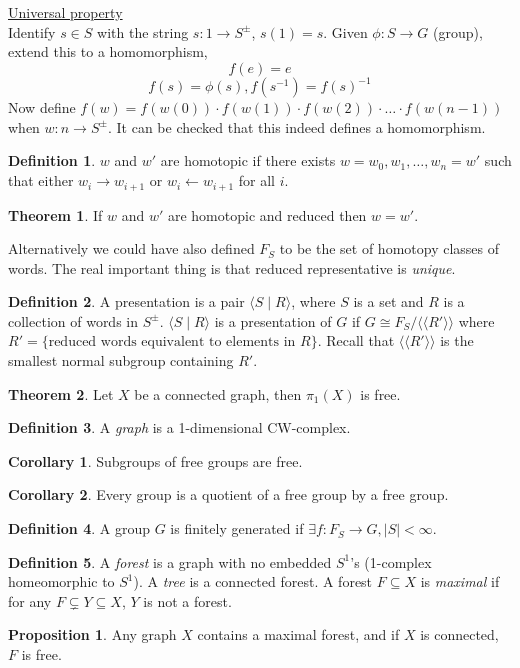 \documentclass[a4paper,14pt]{extarticle}
\theoremstyle{definition}
\newtheorem*{theorem}{Theorem}
\newtheorem*{definition}{Definition}
\newtheorem*{corollary}{Corollary}
\newtheorem*{proposition}{Proposition}
\begin{document}
\noindent\underline{Universal property} \\ 
Identify $s\in S$ with the string $s:1\rightarrow S^\pm$, $s(1)=s$. Given 
$\phi:S\rightarrow G$ (group), extend this to a homomorphism,
\[f(e)=e\]\[f(s)=\phi(s), f(s^{-1})=f(s)^{-1}\] Now define $f(w)=f(w(0))\cdot f(w(1))\cdot
f(w(2))\cdot\ldots\cdot f(w(n-1))$ when $w:n\rightarrow S^\pm$. It can be checked that 
this indeed defines a homomorphism.

\begin{definition}
  $w$ and $w'$ are homotopic if there exists $w=w_0,w_1,\ldots,w_n=w'$ such that either 
  $w_i\rightarrow w_{i+1}$ or $w_i\leftarrow w_{i+1}$ for all $i$.
\end{definition}

\begin{theorem}
  If $w$ and $w'$ are homotopic and reduced then $w=w'$.
\end{theorem}
Alternatively we could have also defined $F_S$ to be the set of homotopy classes of words.
The real important thing is that reduced representative is \textit{unique}.

\begin{definition}
  A presentation is a pair $\langle S\mid R\rangle$, where $S$ is a set and $R$ is 
  a collection of words in $S^\pm$. $\langle S\mid R\rangle$ is a presentation of $G$ if 
  $G\cong F_S/\langle\langle R'\rangle\rangle$ where $R'=\{\text{reduced words equivalent to elements in $R$}\}$. Recall that $\langle\langle R'\rangle\rangle$ is the smallest 
  normal subgroup containing $R'$.
\end{definition}

\begin{theorem}
  Let $X$ be a connected graph, then $\pi_1(X)$ is free.
\end{theorem}

\begin{definition}
  A \textit{graph} is a 1-dimensional CW-complex.
\end{definition}

\begin{corollary}
  Subgroups of free groups are free.
\end{corollary}

\begin{corollary}
  Every group is a quotient of a free group by a free group.
\end{corollary}

\begin{definition}
  A group $G$ is finitely generated if $\exists f:F_S\rightarrow G, |S|<\infty$.
\end{definition}

\begin{definition}
  A \textit{forest} is a graph with no embedded $S^1$'s (1-complex homeomorphic to $S^1$).
  A \textit{tree} is a connected forest. A forest $F\subseteq X$ is \textit{maximal} if for any 
  $F\subsetneq Y\subseteq X$, $Y$ is not a forest.
\end{definition}

\begin{proposition}
  Any graph $X$ contains a maximal forest, and if $X$ is connected, $F$ is free.
\end{proposition}
\end{document}
